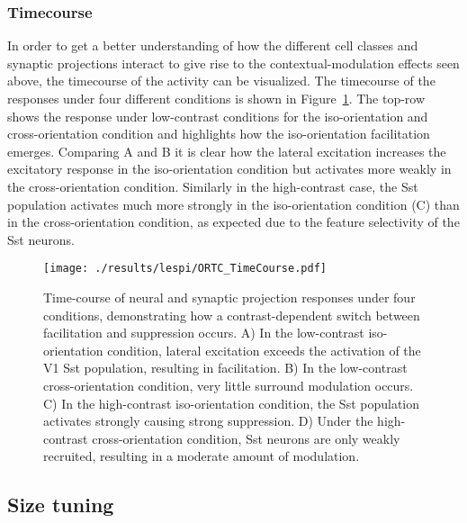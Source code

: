 \subsubsection{Timecourse}

In order to get a better understanding of how the different cell
classes and synaptic projections interact to give rise to the
contextual-modulation effects seen above, the timecourse of the
activity can be visualized. The timecourse of the responses under four
different conditions is shown in Figure~\ref{ORTC_TimeCourse}. The
top-row shows the response under low-contrast conditions for the
iso-orientation and cross-orientation condition and highlights how the
iso-orientation facilitation emerges. Comparing A and B it is clear 
how the lateral excitation increases the excitatory response in
the iso-orientation condition but activates more weakly in the
cross-orientation condition. Similarly in the high-contrast case, the
Sst population activates much more strongly in the iso-orientation
condition (C) than in the cross-orientation condition, as expected due
to the feature selectivity of the Sst neurons.

\begin{figure}
	\centering
        \texttt{[image: ./results/lespi/ORTC\_TimeCourse.pdf]}
	\caption[Time-course of neural and synaptic projection responses
      under four conditions, demonstrating how a contrast-dependent
      switch between facilitation and suppression occurs]{Time-course
      of neural and synaptic projection responses under four
      conditions, demonstrating how a contrast-dependent switch
      between facilitation and suppression occurs. A) In the low-contrast
      iso-orientation condition, lateral excitation exceeds the
      activation of the V1 Sst population, resulting in
      facilitation. B) In the low-contrast cross-orientation condition,
      very little surround modulation occurs. C) In the high-contrast
      iso-orientation condition, the Sst population activates strongly
      causing strong suppression. D) Under the high-contrast
      cross-orientation condition, Sst neurons are only weakly
      recruited, resulting in a moderate amount of modulation.}
	\label{ORTC_TimeCourse}
\end{figure}

\subsection{Size tuning}

